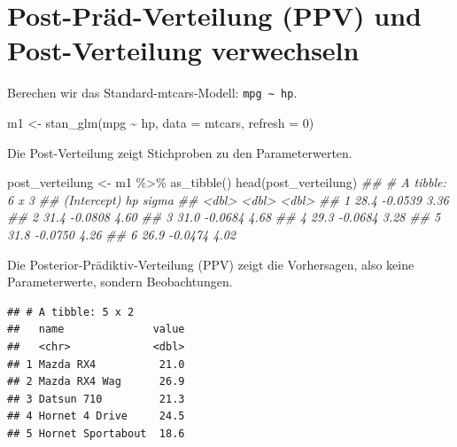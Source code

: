 \documentclass[
  a4paper,
  DIV=11]{scrreprt}
\newenvironment{Shaded}{\begin{snugshade}}{\end{snugshade}}
\newcommand{\AttributeTok}[1]{\textcolor[rgb]{0.40,0.45,0.13}{#1}}
\newcommand{\DecValTok}[1]{\textcolor[rgb]{0.68,0.00,0.00}{#1}}
\newcommand{\DocumentationTok}[1]{\textcolor[rgb]{0.37,0.37,0.37}{\textit{#1}}}
\newcommand{\FunctionTok}[1]{\textcolor[rgb]{0.28,0.35,0.67}{#1}}
\newcommand{\NormalTok}[1]{\textcolor[rgb]{0.00,0.23,0.31}{#1}}
\newcommand{\OtherTok}[1]{\textcolor[rgb]{0.00,0.23,0.31}{#1}}
\newcommand{\SpecialCharTok}[1]{\textcolor[rgb]{0.37,0.37,0.37}{#1}}
\theoremstyle{definition}
\theoremstyle{remark}
\begin{document}
\hypertarget{post-pruxe4d-verteilung-ppv-und-post-verteilung-verwechseln}{%
\section{Post-Präd-Verteilung (PPV) und Post-Verteilung verwechseln
🤷}\label{post-pruxe4d-verteilung-ppv-und-post-verteilung-verwechseln}}

Berechen wir das Standard-mtcars-Modell:
\texttt{mpg\ \textasciitilde{}\ hp}.

\begin{Shaded}
\begin{Highlighting}[]
\NormalTok{m1 }\OtherTok{\textless{}{-}} \FunctionTok{stan\_glm}\NormalTok{(mpg }\SpecialCharTok{\textasciitilde{}}\NormalTok{ hp, }\AttributeTok{data =}\NormalTok{ mtcars, }\AttributeTok{refresh =} \DecValTok{0}\NormalTok{)}
\end{Highlighting}
\end{Shaded}

Die Post-Verteilung zeigt Stichproben zu den Parameterwerten.

\begin{Shaded}
\begin{Highlighting}[]
\NormalTok{post\_verteilung }\OtherTok{\textless{}{-}}\NormalTok{ m1 }\SpecialCharTok{\%\textgreater{}\%} 
  \FunctionTok{as\_tibble}\NormalTok{()}
\FunctionTok{head}\NormalTok{(post\_verteilung)}
\DocumentationTok{\#\# \# A tibble: 6 x 3}
\DocumentationTok{\#\#   \textasciigrave{}(Intercept)\textasciigrave{}      hp sigma}
\DocumentationTok{\#\#           \textless{}dbl\textgreater{}   \textless{}dbl\textgreater{} \textless{}dbl\textgreater{}}
\DocumentationTok{\#\# 1          28.4 {-}0.0539  3.36}
\DocumentationTok{\#\# 2          31.4 {-}0.0808  4.60}
\DocumentationTok{\#\# 3          31.0 {-}0.0684  4.68}
\DocumentationTok{\#\# 4          29.3 {-}0.0684  3.28}
\DocumentationTok{\#\# 5          31.8 {-}0.0750  4.26}
\DocumentationTok{\#\# 6          26.9 {-}0.0474  4.02}
\end{Highlighting}
\end{Shaded}

Die Posterior-Prädiktiv-Verteilung (PPV) zeigt die Vorhersagen, also
keine Parameterwerte, sondern Beobachtungen.

\begin{verbatim}
## # A tibble: 5 x 2
##   name              value
##   <chr>             <dbl>
## 1 Mazda RX4          21.0
## 2 Mazda RX4 Wag      26.9
## 3 Datsun 710         21.3
## 4 Hornet 4 Drive     24.5
## 5 Hornet Sportabout  18.6
\end{verbatim}
\end{document}
